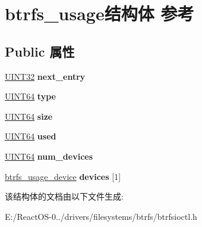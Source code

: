 \hypertarget{structbtrfs__usage}{}\section{btrfs\+\_\+usage结构体 参考}
\label{structbtrfs__usage}
\subsection*{Public 属性}
\begin{DoxyCompactItemize}
\item 
\mbox{\label{structbtrfs__usage_a4a23bd99e16665107914a6b868b627f9}} 
\hyperlink{_processor_bind_8h_ae1e6edbbc26d6fbc71a90190d0266018}{U\+I\+N\+T32} {\bfseries next\+\_\+entry}
\item 
\mbox{\label{structbtrfs__usage_a76bf4dc555a0d33a9205f93b355163d4}} 
\hyperlink{_processor_bind_8h_a57be03562867144161c1bfee95ca8f7c}{U\+I\+N\+T64} {\bfseries type}
\item 
\mbox{\label{structbtrfs__usage_a1ec55708957294fe05cd81e05ad2af76}} 
\hyperlink{_processor_bind_8h_a57be03562867144161c1bfee95ca8f7c}{U\+I\+N\+T64} {\bfseries size}
\item 
\mbox{\label{structbtrfs__usage_a6780fee715db440ef6e5175db7ee84b8}} 
\hyperlink{_processor_bind_8h_a57be03562867144161c1bfee95ca8f7c}{U\+I\+N\+T64} {\bfseries used}
\item 
\mbox{\label{structbtrfs__usage_a31202d4c4a54d767e282a9281410b610}} 
\hyperlink{_processor_bind_8h_a57be03562867144161c1bfee95ca8f7c}{U\+I\+N\+T64} {\bfseries num\+\_\+devices}
\item 
\mbox{\label{structbtrfs__usage_a7a7ffe75ef9080a7c4d6567df82736ce}} 
\hyperlink{structbtrfs__usage__device}{btrfs\+\_\+usage\+\_\+device} {\bfseries devices} \mbox{[}1\mbox{]}
\end{DoxyCompactItemize}


该结构体的文档由以下文件生成\+:\begin{DoxyCompactItemize}
\item 
E\+:/\+React\+O\+S-\/0../drivers/filesystems/btrfs/btrfsioctl.\+h\end{DoxyCompactItemize}
